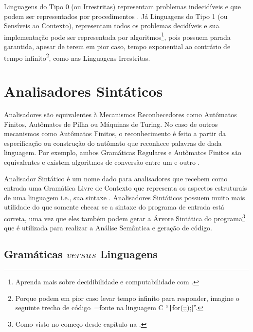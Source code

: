 Linguagens do Tipo 0 (ou Irrestritas) representam problemas indecidíveis e
que podem ser representados por procedimentos \cite{sipserBook}.
Já Linguagens do Tipo 1 (ou Sensíveis ao Contexto),
representam todos os problemas decidíveis e
sua implementação pode ser representada por algoritmos\footnote{
Aprenda mais sobre decidibilidade e
computabilidade com .
},
pois possuem parada garantida,
apesar de terem em pior caso,
tempo exponential ao contrário de tempo infinito\footnote{
Porque podem em pior caso levar tempo infinito para responder,
imagine o seguinte trecho de código~=fonte na linguagem C ``\texttt|for(;;);|''.
},
como nas Linguagens Irrestritas.


\section{Analisadores Sintáticos}
\label{section:analisadoresSintaticos}

Analisadores são equivalentes à Mecanismos Reconhecedores como Autômatos Finitos,
Autômatos de Pilha ou
Máquinas de Turing.
No caso de outros mecanismos como Autômatos Finitos,
o reconhecimento é feito a partir da especificação ou
construção do autômato que reconhece palavras de dada linguagem.
Por exemplo,
ambos Gramáticas Regulares e
Autômatos Finitos são equivalentes e
existem algoritmos de conversão entre um e
outro \cite{hopcroftBook}.

Analisador Sintático
é um nome dado para analisadores que recebem como entrada uma Gramática Livre de Contexto que representa os aspectos estruturais de uma linguagem i.e.,
sua sintaxe \cite{ahoCompilerDragonBook}.
Analisadores Sintáticos possuem muito mais utilidade do que somente checar se a sintaxe do programa de entrada está correta,
uma vez que eles também podem gerar a Árvore Sintática do programa\footnote{
Como visto no começo desde capítulo na .
}
que é utilizada para realizar a Análise Semântica e
geração de código.


\subsection{Gramáticas $versus$ Linguagens}
\label{section:gramaticasVersusLinguagens}

